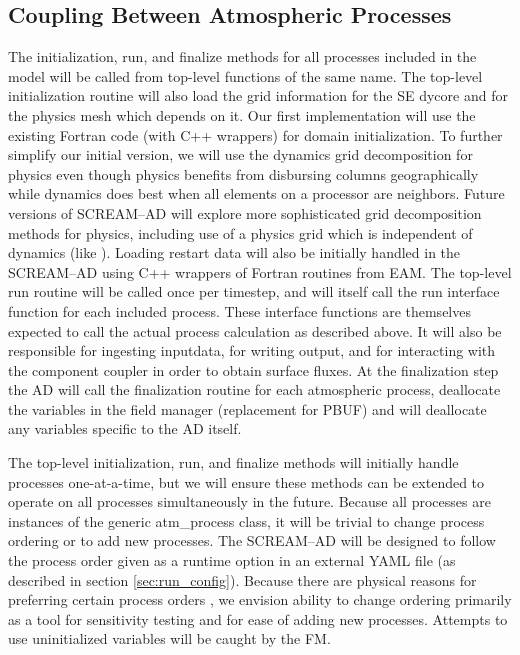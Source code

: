 \subsection{Coupling Between Atmospheric Processes}
\label{sec:proc_cpl}

The initialization, run, and finalize methods for all processes included in the model will be called from top-level functions of the same name. The top-level initialization routine will also load the grid information for the SE dycore and for the physics mesh which depends on it. Our first implementation will use the existing Fortran code (with C++ wrappers) for domain initialization. To further simplify our initial version, we will use the dynamics grid decomposition for physics even though physics benefits from disbursing columns geographically while dynamics does best when all elements on a processor are neighbors. Future versions of SCREAM--AD will explore more sophisticated grid decomposition methods for physics, including use of a physics grid which is independent of dynamics (like \cite{herrington_physgrid}). Loading restart data will also be initially handled in the SCREAM--AD using C++ wrappers of Fortran routines from EAM. The top-level run routine will be called once per timestep, and will itself call the run interface function for each included process. These interface functions are themselves expected to call the actual process calculation as described above. It will also be responsible for ingesting inputdata, for writing output, and for interacting with the component coupler in order to obtain surface fluxes. At the finalization step the AD will call the finalization routine for each atmospheric process, deallocate the variables in the field manager (replacement for PBUF) and will deallocate any variables specific to the AD itself.

The top-level initialization, run, and finalize methods will initially handle processes one-at-a-time, but we will ensure these methods can be extended to operate on all processes simultaneously in the future. Because all processes are instances of the generic atm\_process class, it will be trivial to change process ordering or to add new processes. The SCREAM--AD will be designed to follow the process order given as a runtime option in an external YAML file (as described in section \ref{sec:run_config}). Because there are physical reasons for preferring certain process orders \cite{Donahue_param_order}, we envision ability to change ordering primarily as a tool for sensitivity testing and for ease of adding new processes. Attempts to use uninitialized variables will be caught by the FM.

